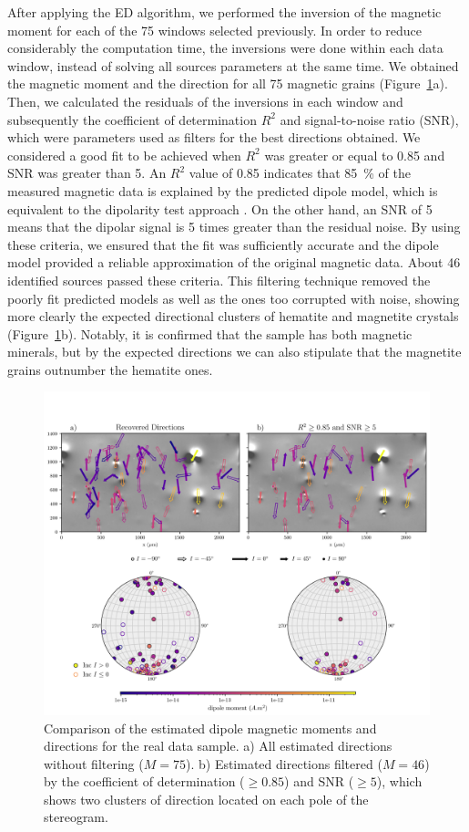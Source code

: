 After applying the ED algorithm, we performed the inversion of the magnetic moment for each of the 75 windows selected previously. In order to reduce considerably the computation time, the inversions were done within each data window, instead of solving all sources parameters at the same time. We obtained the magnetic moment and the direction for all 75 magnetic grains (Figure~\ref{real-data-stereograms}a). Then, we calculated the residuals of the inversions in each window and subsequently the coefficient of determination $R^2$ and signal-to-noise ratio (SNR), which were parameters used as filters for the best directions obtained. We considered a good fit to be achieved when $R^2$ was greater or equal to 0.85 and SNR was greater than 5. An $R^2$ value of 0.85 indicates that \qty{85}{\percent} of the measured magnetic data is explained by the predicted dipole model, which is equivalent to the dipolarity test approach \citep{Fu2020}. On the other hand, an SNR of 5 means that the dipolar signal is 5 times greater than the residual noise. By using these criteria, we ensured that the fit was sufficiently accurate and the dipole model provided a reliable approximation of the original magnetic data. About 46 identified sources passed these criteria. This filtering technique removed the poorly fit predicted models as well as the ones too corrupted with noise, showing more clearly the expected directional clusters of hematite and magnetite crystals (Figure~\ref{real-data-stereograms}b). Notably, it is confirmed that the sample has both magnetic minerals, but by the expected directions we can also stipulate that the magnetite grains outnumber the hematite ones.

\begin{figure}[tb!]
\centering
\includegraphics[width=1\linewidth]{figures/real-data-stereograms.png}
\caption{
Comparison of the estimated dipole magnetic moments and directions for the real data sample.
a) All estimated directions without filtering ($M=75$). b) Estimated directions filtered ($M=46$) by the coefficient of determination ($\geq 0.85$) and SNR ($\geq 5$), which shows two clusters of direction located on each pole of the stereogram.
}
\label{real-data-stereograms}
\end{figure}

